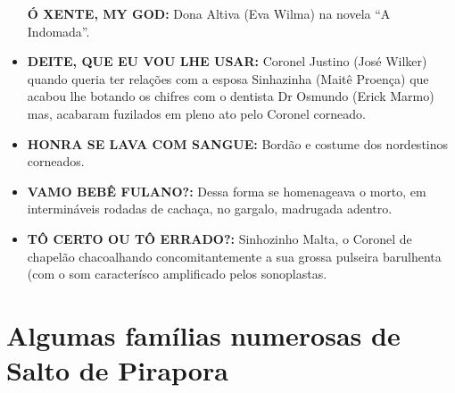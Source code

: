 \documentclass[12pt,brazil,]{book}
\begin{document}
\begin{itemize}
  \textbf{Ó XENTE, MY GOD:} Dona Altiva (Eva Wilma) na novela ``A
  Indomada''.\\
\item
  \textbf{DEITE, QUE EU VOU LHE USAR:} Coronel Justino (José Wilker)
  quando queria ter relações com a esposa Sinhazinha (Maitê Proença) que
  acabou lhe botando os chifres com o dentista Dr Osmundo (Erick Marmo)
  mas, acabaram fuzilados em pleno ato pelo Coronel corneado.\\
\item
  \textbf{HONRA SE LAVA COM SANGUE:} Bordão e costume dos nordestinos
  corneados.\\
\item
  \textbf{VAMO BEBÊ FULANO?:} Dessa forma se homenageava o morto, em
  intermináveis rodadas de cachaça, no gargalo, madrugada adentro.\\
\item
  \textbf{TÔ CERTO OU TÔ ERRADO?:} Sinhozinho Malta, o Coronel de
  chapelão chacoalhando concomitantemente a sua grossa pulseira
  barulhenta (com o som caracterísco amplificado pelos sonoplastas.
\end{itemize}

\section{Algumas famílias numerosas de Salto de
Pirapora}\label{algumas-famuxedlias-numerosas-de-salto-de-pirapora}
\end{document}
